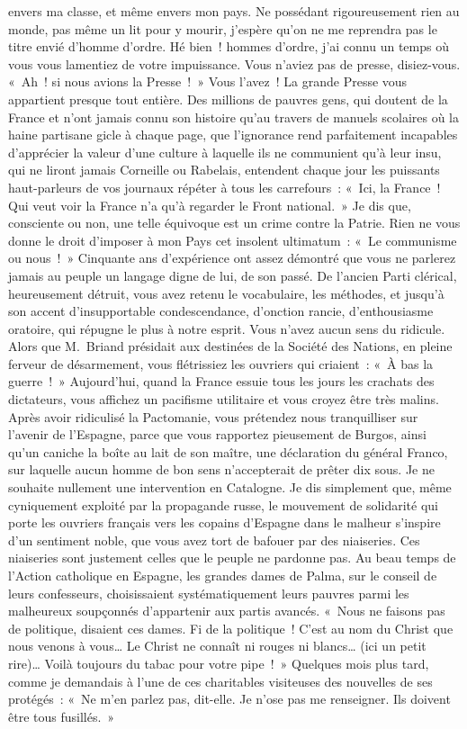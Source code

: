 \documentclass[french,twoside]{book} %
\begin{document}
envers ma classe, et même envers mon pays. Ne possédant rigoureusement rien au monde, pas même un lit pour y mourir, j’espère qu’on ne me reprendra pas le titre envié d’homme d’ordre. Hé bien ! hommes d’ordre, j’ai connu un temps où vous vous lamentiez de votre impuissance. Vous n’aviez pas de presse, disiez-vous. « Ah ! si nous avions la Presse ! » Vous l’avez ! La grande Presse vous appartient presque tout entière. Des millions de pauvres gens, qui doutent de la France et n’ont jamais connu son histoire qu’au travers de manuels scolaires où la haine partisane gicle à chaque page, que l’ignorance rend parfaitement incapables d’apprécier la valeur d’une culture à laquelle ils ne communient qu’à leur insu, qui ne liront jamais Corneille ou Rabelais, entendent chaque jour les puissants haut-parleurs de vos journaux répéter à tous les carrefours : « Ici, la France ! Qui veut voir la France n’a qu’à regarder le Front national. » Je dis que, consciente ou non, une telle équivoque est un crime contre la Patrie. Rien ne vous donne le droit d’imposer à mon Pays cet insolent ultimatum : « Le communisme ou nous ! » Cinquante ans d’expérience ont assez démontré que vous ne parlerez jamais au peuple un langage digne de lui, de son passé. De l’ancien Parti clérical, heureusement détruit, vous avez retenu le vocabulaire, les méthodes, et jusqu’à son accent d’insupportable condescendance, d’onction rancie, d’enthousiasme oratoire, qui répugne le plus à notre esprit. Vous n’avez aucun sens du ridicule. Alors que M. Briand présidait aux destinées de la Société des Nations, en pleine ferveur de désarmement, vous flétrissiez les ouvriers qui criaient : « À bas la guerre ! » Aujourd’hui, quand la France essuie tous les jours les crachats des dictateurs, vous affichez un pacifisme utilitaire et vous croyez être très malins. Après avoir ridiculisé la Pactomanie, vous prétendez nous tranquilliser sur l’avenir de l’Espagne, parce que vous rapportez pieusement de Burgos, ainsi qu’un caniche la boîte au lait de son maître, une déclaration du général Franco, sur laquelle aucun homme de bon sens n’accepterait de prêter dix sous. Je ne souhaite nullement une intervention en Catalogne. Je dis simplement que, même cyniquement exploité par la propagande russe, le mouvement de solidarité qui porte les ouvriers français vers les copains d’Espagne dans le malheur s’inspire d’un sentiment noble, que vous avez tort de bafouer par des niaiseries. Ces niaiseries sont justement celles que le peuple ne pardonne pas. Au beau temps de l’Action catholique en Espagne, les grandes dames de Palma, sur le conseil de leurs confesseurs, choisissaient systématiquement leurs pauvres parmi les malheureux soupçonnés d’appartenir aux partis avancés. « Nous ne faisons pas de politique, disaient ces dames. Fi de la politique ! C’est au nom du Christ que nous venons à vous… Le Christ ne connaît ni rouges ni blancs… (ici un petit rire)… Voilà toujours du tabac pour votre pipe ! » Quelques mois plus tard, comme je demandais à l’une de ces charitables visiteuses des nouvelles de ses protégés : « Ne m’en parlez pas, dit-elle. Je n’ose pas me renseigner. Ils doivent être tous fusillés. »
\end{document}

